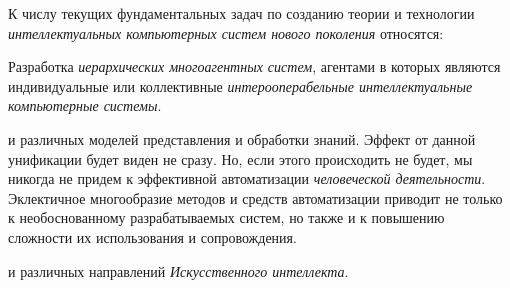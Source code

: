 К числу текущих фундаментальных задач по созданию теории и технологии \textit{интеллектуальных компьютерных систем нового поколения} относятся:
\begin{textitemize}
	\item Разработка  \textit{иерархических многоагентных систем}, агентами в которых являются индивидуальные или коллективные \textit{интерооперабельные интеллектуальные компьютерные системы}.
	\medskip
	\item {} и  различных моделей представления и обработки знаний. Эффект от данной унификации будет виден не сразу. Но, если этого происходить не будет, мы никогда не придем к эффективной  автоматизации \textit{человеческой деятельности}. Эклектичное многообразие методов и средств автоматизации приводит не только к необоснованному  разрабатываемых систем, но также и к повышению сложности их использования и сопровождения.
	\medskip
	\item {} и  различных направлений \textit{Искусственного интеллекта}.
	

\end{textitemize}
